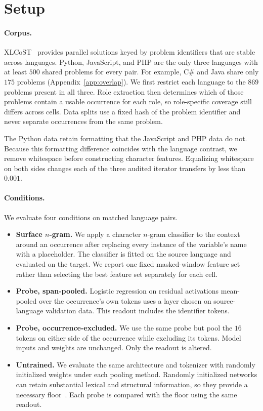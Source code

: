 \documentclass{article}
\begin{document}
\section{Setup}

\paragraph{Corpus.}
XLCoST~\citep{zhu2022xlcost} provides parallel solutions keyed by problem
identifiers that are stable across languages. Python, JavaScript, and PHP are
the only three languages with at least $500$ shared problems for every pair.
For example, C\# and Java share only $175$ problems
(Appendix~\ref{app:overlap}). We first restrict each language to the $869$
problems present in all three. Role extraction then determines which of those
problems contain a usable occurrence for each role, so role-specific coverage
still differs across cells. Data splits use a fixed hash of the problem
identifier and never separate occurrences from the same problem.

The Python data retain formatting that the JavaScript and PHP data do not.
Because this formatting difference coincides with the language contrast, we
remove whitespace before constructing character features. Equalizing
whitespace on both sides changes each of the three audited iterator transfers
by less than $0.001$.

\paragraph{Conditions.}
We evaluate four conditions on matched language pairs.

\begin{itemize}\itemsep2pt
\item \textbf{Surface $n$-gram.} We apply a character $n$-gram classifier to
the context around an occurrence after replacing every instance of the
variable's name with a placeholder. The classifier is fitted on the source language and
evaluated on the target. We report one fixed masked-window feature set rather
than selecting the best feature set separately for each cell.
\item \textbf{Probe, span-pooled.} Logistic regression on residual activations
mean-pooled over the occurrence's own tokens uses a layer chosen on
source-language validation data. This readout includes the identifier tokens.
\item \textbf{Probe, occurrence-excluded.} We use the same probe but pool the
$16$ tokens on either side of the occurrence while excluding its tokens. Model
inputs and weights are unchanged. Only the readout is altered.
\item \textbf{Untrained.} We evaluate the same architecture and tokenizer with
randomly initialized weights under each pooling method. Randomly initialized networks
can retain substantial lexical and structural information, so they provide a
necessary floor~\citep{zhang2018language,hewitt2019control}. Each probe is
compared with the floor using the same readout.
\end{itemize}
\end{document}
